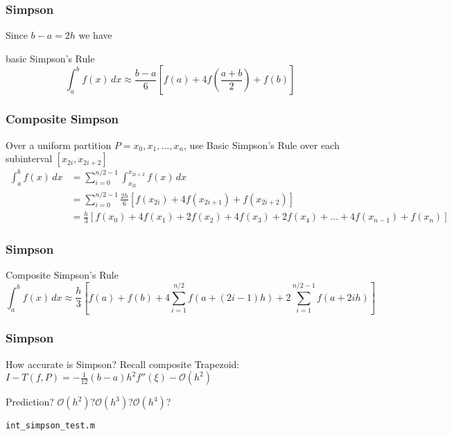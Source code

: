 \documentclass[10pt]{beamer}
\newcommand{\mO}{{\mathcal{O}}}
\begin{document}
\begin{frame}
\frametitle{Simpson}
Since $b-a=2h$ we have
\begin{block}{basic Simpson's Rule}
  \begin{equation*}
  \int_{a}^{b} f(x)\,dx \approx \frac{b-a}{6}\left[f(a) + 4f\left(\frac{a+b}{2}\right) + f(b)\right]
  \end{equation*}
\end{block}
\begin{center}
\end{center}
\end{frame}
\begin{frame}
\frametitle{Composite Simpson}
Over a uniform partition $P={x_0,x_1,\dots,x_n}$, use Basic Simpson's Rule over
each subinterval $[x_{2i},x_{2i+2}]$
  \begin{align*}
  \int_{a}^{b} f(x)\,dx & = \sum_{i=0}^{n/2-1} \int_{x_{2i}}^{x_{2i+2}} f(x)\,dx\\
                        & = \sum_{i=0}^{n/2-1} \frac{2h}{6}\left[f(x_{2i}) + 4f(x_{2i+1}) + f(x_{2i+2})\right]\\
                        & = \frac{h}{3}\left[f(x_{0}) + 4f(x_1) + 2f(x_2) + 4f(x_3) + 2f(x_4) + \dots + 4f(x_{n-1}) +f(x_{n})\right]
  \end{align*}
\end{frame}
\begin{frame}
\frametitle{Simpson}
\begin{block}{Composite Simpson's Rule}
  \begin{equation*}
  \int_{a}^{b} f(x)\,dx \approx \frac{h}{3}\left[f(a) + f(b) + 4 \sum_{i=1}^{n/2} f(a+(2i-1)h) + 2\sum_{i=1}^{n/2 - 1}f(a+2ih)\right]
  \end{equation*}
\end{block}
\begin{center}
\end{center}
\end{frame}
\begin{frame}
\frametitle{Simpson}
How accurate is Simpson?
\bigskip
Recall composite Trapezoid: $I - T(f,P) = -\frac{1}{12}(b-a)h^2f''(\xi) - \mO(h^2)$
\bigskip

Prediction? $\mO(h^2)$?\quad $\mO(h^3)$?\quad $\mO(h^4)$?
\bigskip

\texttt{int\_simpson\_test.m}
\end{frame}
\end{document}

